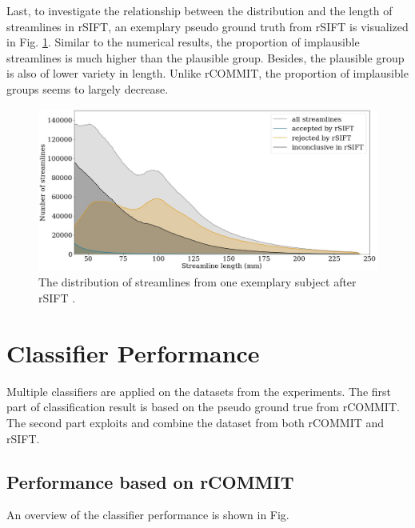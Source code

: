 Last, to investigate the relationship between the distribution and the length of streamlines in rSIFT, an exemplary 
pseudo ground truth from rSIFT is visualized in Fig. \ref*{fig:threegroup_sift}. Similar to the numerical results,
the proportion of implausible streamlines is much higher than the plausible group. Besides, the plausible group is also of lower variety in length.
Unlike rCOMMIT, the proportion of implausible groups seems to largely decrease.

\begin{figure}[ht]
    \centering
    \includegraphics[width= 12cm]{figures/distribution_sift.png}
    \caption{The distribution of streamlines from one exemplary subject after rSIFT \cite{hainAssessingStreamlinePlausibility2022}. }
\label{fig:threegroup_sift}
\end{figure}


\section{Classifier Performance}
Multiple classifiers are applied on the datasets from the experiments. The first part of classification result
is based on the pseudo ground true from rCOMMIT. The second part exploits and combine the dataset 
from both rCOMMIT and rSIFT.
\subsection{Performance based on rCOMMIT}

An overview of the classifier performance is shown in Fig.

